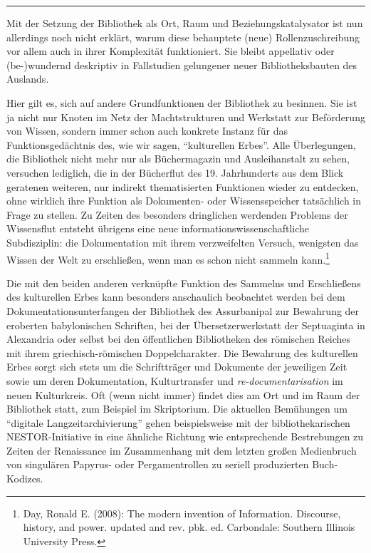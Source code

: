 \begin{center}\rule{0.5\linewidth}{\linethickness}\end{center}

Mit der Setzung der Bibliothek als Ort, Raum und Beziehungskatalysator
ist nun allerdings noch nicht erklärt, warum diese behauptete (neue)
Rollenzuschreibung vor allem auch in ihrer Komplexität funktioniert. Sie
bleibt appellativ oder (be-)wundernd deskriptiv in Fallstudien
gelungener neuer Bibliotheksbauten des Auslands.

Hier gilt es, sich auf andere Grundfunktionen der Bibliothek zu
besinnen. Sie ist ja nicht nur Knoten im Netz der Machtstrukturen und
Werkstatt zur Beförderung von Wissen, sondern immer schon auch konkrete
Instanz für das Funktionsgedächtnis des, wie wir sagen, \enquote{kulturellen
Erbes}. Alle Überlegungen, die Bibliothek nicht mehr nur als
Büchermagazin und Ausleihanstalt zu sehen, versuchen lediglich, die in
der Bücherflut des 19. Jahrhunderts aus dem Blick geratenen weiteren,
nur indirekt thematisierten Funktionen wieder zu entdecken, ohne
wirklich ihre Funktion als Dokumenten- oder Wissensspeicher tatsächlich
in Frage zu stellen. Zu Zeiten des besonders dringlichen werdenden
Problems der Wissensflut entsteht übrigens eine neue
informationswissenschaftliche Subdisziplin: die Dokumentation mit ihrem
verzweifelten Versuch, wenigsten das Wissen der Welt zu erschließen,
wenn man es schon nicht sammeln kann.\footnote{Day, Ronald E. (2008):
  The modern invention of Information. Discourse, history, and power.
  updated and rev. pbk. ed. Carbondale: Southern Illinois University
  Press.}

Die mit den beiden anderen verknüpfte Funktion des Sammelns und
Erschließens des kulturellen Erbes kann besonders anschaulich beobachtet
werden bei dem Dokumentationsunterfangen der Bibliothek des Assurbanipal
zur Bewahrung der eroberten babylonischen Schriften, bei der
Übersetzerwerkstatt der Septuaginta in Alexandria oder selbst bei den
öffentlichen Bibliotheken des römischen Reiches mit ihrem
griechisch-römischen Doppelcharakter. Die Bewahrung des kulturellen
Erbes sorgt sich stets um die Schriftträger und Dokumente der jeweiligen
Zeit sowie um deren Dokumentation, Kulturtransfer und
\emph{re-documentarisation} im neuen Kulturkreis. Oft (wenn nicht immer)
findet dies am Ort und im Raum der Bibliothek statt, zum Beispiel im
Skriptorium. Die aktuellen Bemühungen um \enquote{digitale Langzeitarchivierung}
gehen beispielsweise mit der bibliothekarischen NESTOR-Initiative in
eine ähnliche Richtung wie entsprechende Bestrebungen zu Zeiten der
Renaissance im Zusammenhang mit dem letzten großen Medienbruch von
singulären Papyrus- oder Pergamentrollen zu seriell produzierten
Buch-Kodizes.

